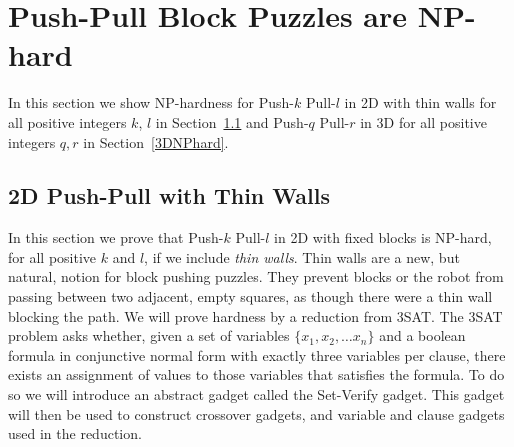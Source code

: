 
\section{Push-Pull Block Puzzles are NP-hard}
In this section we show NP-hardness for Push-$k$ Pull-$l$ in 2D with thin walls for all positive integers $k$, $l$ in Section~\ref{2DNPhard} and Push-$q$ Pull-$r$ in 3D for all positive integers $q, r$ in Section~\ref{3DNPhard}. 

 


\subsection{2D Push-Pull with Thin Walls}
\label{2DNPhard}
In this section we prove that Push-$k$ Pull-$l$ in 2D with fixed blocks is NP-hard, for all positive $k$ and $l$, if we include \emph{thin walls}. Thin walls are a new, but natural, notion for block pushing puzzles. They prevent blocks or the robot from passing between two adjacent, empty squares, as though there were a thin wall blocking the path. We will prove hardness by a reduction from 3SAT. The 3SAT problem asks whether, given a set of variables $\{x_1, x_2, \ldots x_n\}$ and a boolean formula in conjunctive normal form with exactly three variables per clause, there exists an assignment of values to those variables that satisfies the formula\cite{NPBook}. To do so we will introduce an abstract gadget called the Set-Verify gadget. This gadget will then be used to construct crossover gadgets, and variable and clause gadgets used in the reduction.

